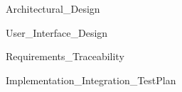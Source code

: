 \documentclass[english]{article}
\begin{document}
\clearpage{}

{Architectural_Design}

\clearpage{}

{User_Interface_Design}

\clearpage{}

{Requirements_Traceability}

\clearpage{}

{Implementation_Integration_TestPlan}

\clearpage{}



\clearpage{}


\end{document}
